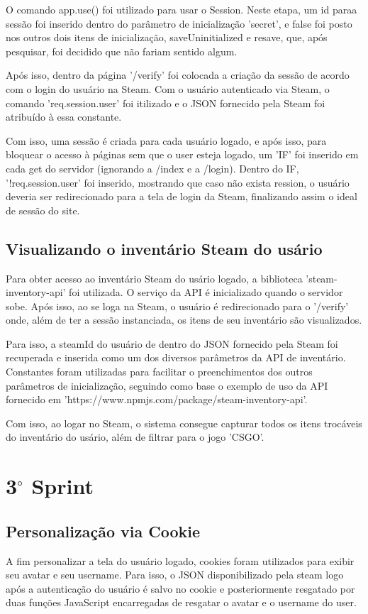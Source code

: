 O comando app.use() foi utilizado para usar o Session. Neste etapa, um id paraa sessão foi inserido dentro do 
parâmetro de inicialização 'secret', e false foi posto nos outros dois itens de inicialização, saveUninitialized e resave, que, 
após pesquisar, foi decidido que não fariam sentido algum.

Após isso, dentro da página '/verify' foi colocada a criação da sessão de acordo com o login do usuário na Steam. 
Com o usuário autenticado via Steam, o comando 'req.session.user' foi itilizado e o JSON fornecido pela Steam 
foi atribuído à essa constante.

Com isso, uma sessão é criada para cada usuário logado, e após isso, para bloquear o acesso à páginas sem que o user 
esteja logado, um 'IF' foi inserido em cada get do servidor (ignorando a /index e a /login). Dentro do IF, 
'!req.session.user' foi inserido, mostrando que caso não exista ression, o usuário deveria ser redirecionado para a 
tela de login da Steam, finalizando assim o ideal de sessão do site. 

\subsection{Visualizando o inventário Steam do usário}
Para obter acesso ao inventário Steam do usário logado, a biblioteca 'steam-inventory-api' foi utilizada. 
O serviço da API é inicializado quando o servidor sobe. Após isso, ao se loga na Steam, o usuário é redirecionado para o '/verify' onde, 
além de ter a sessão instanciada, os itens de seu inventário são visualizados.

Para isso, a steamId do usuário de dentro do JSON fornecido pela Steam foi recuperada e inserida como um dos diversos parâmetros da API de 
inventário. Constantes foram utilizadas para facilitar o preenchimentos dos outros parâmetros de inicialização, seguindo como base o 
exemplo de uso da API fornecido em 'https://www.npmjs.com/package/steam-inventory-api'.

Com isso, ao logar no Steam, o sistema consegue capturar todos os itens trocáveis do inventário do usário, 
além de filtrar para o jogo 'CSGO'.


\section{3$^{\circ}$ Sprint}
\subsection{Personalização via Cookie}
A fim personalizar a tela do usuário logado, cookies foram utilizados para 
exibir seu avatar e seu username. Para isso, o JSON disponibilizado pela steam logo 
após a autenticação do usuário é salvo no cookie e posteriormente resgatado por duas 
funções JavaScript encarregadas de resgatar o avatar e o username do user.

